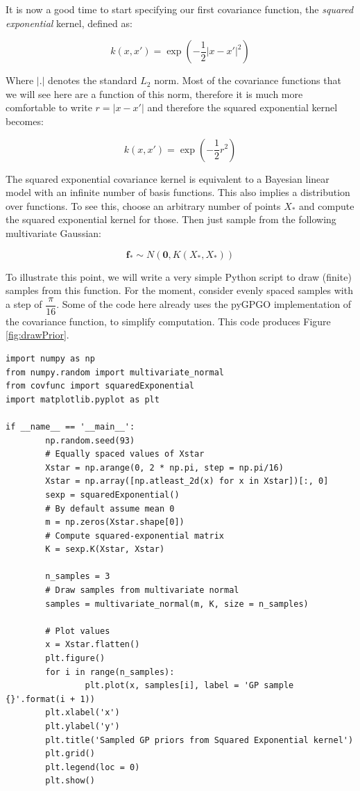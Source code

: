 \documentclass[10pt,a4paper,twoside]{book}
\begin{document}
It is now a good time to start specifying our first covariance function, the \textit{squared exponential} kernel, defined as:

\begin{equation}
k(x, x') = \exp\left(-\dfrac{1}{2}|x - x'|^2\right)
\end{equation}

Where $|.|$ denotes the standard $L_2$ norm. Most of the covariance functions that we will see here are a function of this norm, therefore it is much more comfortable to write $r = |x - x'|$ and therefore the squared exponential kernel becomes:

\begin{equation}
\label{sqexp}
k(x, x') = \exp\left(-\dfrac{1}{2}r^2\right)
\end{equation}

The squared exponential covariance kernel is equivalent to a Bayesian linear model with an infinite number of basis functions. This also implies a distribution over functions. To see this, choose an arbitrary number of points $X_*$ and compute the squared exponential kernel for those. Then just sample from the following multivariate Gaussian:

\begin{equation}
\label{fprior}
\boldsymbol{f_*} \sim N\left(\boldsymbol{0}, K(X_*, X_*)\right)
\end{equation}

To illustrate this point, we will write a very simple Python script to draw (finite) samples from this function. For the moment, consider evenly spaced samples with a step of $\dfrac{\pi}{16}$. Some of the code here already uses the pyGPGO implementation of the covariance function, to simplify computation. This code produces Figure \ref{fig:drawPrior}.

\begin{verbatim}
import numpy as np
from numpy.random import multivariate_normal
from covfunc import squaredExponential
import matplotlib.pyplot as plt

if __name__ == '__main__':
        np.random.seed(93)
        # Equally spaced values of Xstar
        Xstar = np.arange(0, 2 * np.pi, step = np.pi/16)
        Xstar = np.array([np.atleast_2d(x) for x in Xstar])[:, 0]
        sexp = squaredExponential()
        # By default assume mean 0
        m = np.zeros(Xstar.shape[0])
        # Compute squared-exponential matrix
        K = sexp.K(Xstar, Xstar)

        n_samples = 3
        # Draw samples from multivariate normal
        samples = multivariate_normal(m, K, size = n_samples)

        # Plot values
        x = Xstar.flatten()
        plt.figure()
        for i in range(n_samples):
                plt.plot(x, samples[i], label = 'GP sample {}'.format(i + 1))
        plt.xlabel('x')
        plt.ylabel('y')
        plt.title('Sampled GP priors from Squared Exponential kernel')
        plt.grid()
        plt.legend(loc = 0)
        plt.show()	
\end{verbatim}
\end{document}

